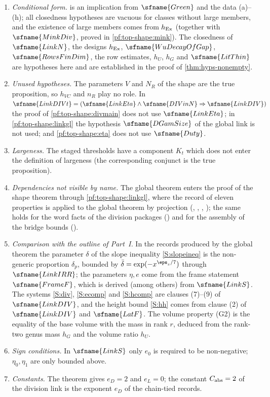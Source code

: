 \begin{enumerate}[label=(\arabic*)]
\item \emph{Conditional form.}  is an implication from $\sfname{Green}$ and the data (a)--(h);
all closedness hypotheses are vacuous for classes without large members, and the existence of large members comes from
$h_{\rm Ex}$ (together with $\sfname{MinkDiv}$, proved in \cref{pf:top-shape:mink}). The closedness of $\sfname{LinkN}$, the
designs $h_{\rm Ex}$, $\sfname{WuDecayOfGap}$, $\sfname{RowsFinDim}$, the row estimates, $h_U$, $h_G$ and
$\sfname{LitThin}$ are hypotheses here and are established in the proof of \cref{thm:hyps-nonempty}.
\item \emph{Unused hypotheses.} The parameters $V$ and $N_R$ of the shape are the true proposition, so $h_{VC}$ and $n_R$
play no role. In $\sfname{LinkDIVt}=(\sfname{LinkEta}\wedge\sfname{DIVinN}\Rightarrow\sfname{LinkDIV})$ the proof of
\cref{pf:top-shape:divmain} does not use $\sfname{LinkEta}$; in \cref{pf:top-shape:linkgl} the hypothesis
$\sfname{DGamSize}$ of the global link is not used; and \cref{pf:top-shape:eta} does not use $\sfname{Duty}$.
\item \emph{Largeness.} The staged thresholds have a component $K_t$ which does not enter the definition of largeness (the
corresponding conjunct is the true proposition).
\item \emph{Dependencies not visible by name.} The global theorem enters the proof of the shape theorem through
\cref{pf:top-shape:linkgl}, where the record of eleven properties is applied to the global theorem by projection
(, ,
, ); the same holds for the
word facts of the division packages () and for the
assembly of the bridge bounds ().
\item \emph{Comparison with the outline of Part~I.} In the records produced by the global theorem the parameter $\delta$
of the slope inequality \ref{S:slopeineq} is the non-generic proportion $\delta_p$, bounded by
$\bar\delta=\exp(-x^{\eps_z/7})$ through $\sfname{LinkIRR}$; the parameters $\eta,e$ come from the frame statement
$\sfname{FrameF}$, which is derived (among others) from $\sfname{LinkS}$. The systems \ref{S:div}, \ref{S:ecomp} and
\ref{S:hcomp} are clauses (7)--(9) of $\sfname{LinkDIV}$, and the height bound \ref{S:hh} comes from clause (2) of
$\sfname{LinkDIV}$ and $\sfname{LatF}$. The volume property (G2) is the equality of the base volume with the mass in rank
$r$, deduced from the rank-two genus mass $h_G$ and the volume ratio $h_U$.
\item \emph{Sign conditions.} In $\sfname{LinkS}$ only $e_0$ is required to be non-negative; $\eta_0,\eta_1$ are only
bounded above.
\item \emph{Constants.} The theorem gives $e_D=2$ and $e_L=0$; the constant $C_{\rm abs}=2$ of the division link is the
exponent $e_D$ of the chain-tied records.
\end{enumerate}
